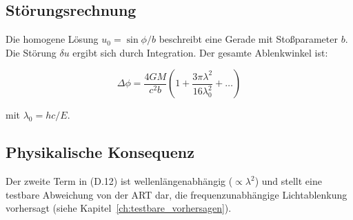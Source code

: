 \subsection{Störungsrechnung}
\label{sub:herleitungen_licht_stoerung}

Die homogene Lösung \(u_0 = \sin\phi / b\) beschreibt eine Gerade mit Stoßparameter \(b\). Die Störung \(\delta u\) ergibt sich durch Integration. Der gesamte Ablenkwinkel ist:

\[
\Delta\phi = \frac{4GM}{c^2 b} \left(1 + \frac{3\pi\lambda^2}{16\lambda_0^2} + \dots\right) \tag{D.12}
\]

mit \(\lambda_0 = hc / E\).

\subsection{Physikalische Konsequenz}
\label{sub:herleitungen_licht_konsequenz}

Der zweite Term in (D.12) ist wellenlängenabhängig (\(\propto \lambda^2\)) und stellt eine testbare Abweichung von der ART dar, die frequenzunabhängige Lichtablenkung vorhersagt (siehe Kapitel~\ref{ch:testbare_vorhersagen}).